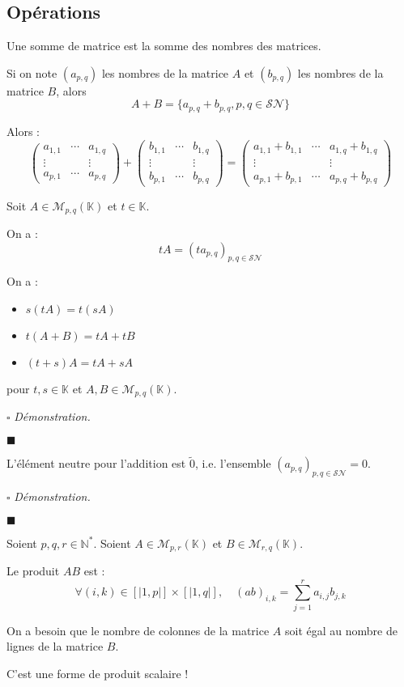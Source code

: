 \documentclass[a4paper, titlepage]{article}
\renewenvironment{proof}{$\square$ \footnotesize\textit{Démonstration.}}{\begin{flushright}$\blacksquare$\end{flushright}}
\begin{document}
	\subsection{Opérations}
	\begin{defn}
		Une somme de matrice est la somme  des nombres des matrices.

		Si on note $(a_{p,q})$ les nombres de la matrice $A$ et $(b_{p,q})$ les nombres de la matrice $B$, alors
		$$ A+B = \{a_{p,q}+b_{p,q},p,q\in\mathcal{SN}\} $$

		Alors :
		$$ \begin{pmatrix} a_{1,1} & \cdots & a_{1,q} \\ \vdots & & \vdots \\ a_{p,1} & \cdots & a_{p,q} \end{pmatrix} + \begin{pmatrix} b_{1,1} & \cdots & b_{1,q} \\ \vdots & & \vdots \\ b_{p,1} & \cdots & b_{p,q} \end{pmatrix} = \begin{pmatrix} a_{1,1} + b_{1,1} & \cdots & a_{1,q} + b_{1,q} \\ \vdots & & \vdots \\ a_{p,1} + b_{p,1} & \cdots & a_{p,q} + b_{p,q} \end{pmatrix} $$
	\end{defn}
	\begin{defn}
		Soit $A\in\mathcal{M}_{p,q}(\mathbb{K})$ et $t\in\mathbb{K}$.

		On a :
		$$ t A = (ta_{p,q})_{p,q\in\mathcal{SN}} $$
	\end{defn}
	\begin{props}
		On a :
		\begin{itemize}
			\item $s(tA) = t(sA)$
			\item $t(A+B) = tA+tB$
			\item $(t+s)A = tA+sA$
		\end{itemize}
		pour $t,s\in\mathbb{K}$ et $A,B\in\mathcal{M}_{p,q}(\mathbb{K})$.
	\end{props}
	\begin{proof}
		\AQT
	\end{proof}
	\begin{props}
		L'élément neutre pour l'addition est $\tilde 0$, i.e. l'ensemble $(a_{p,q})_{p,q\in\mathcal{SN}} = 0$.
	\end{props}
	\begin{proof}
		\AQT
	\end{proof}
	\begin{defn}
		Soient $p,q,r\in\mathbb{N}^*$. Soient $A\in\mathcal{M}_{p,r}(\mathbb{K})$ et $B\in\mathcal{M}_{r,q}(\mathbb{K})$.

		Le produit $AB$ est :
		$$ \forall (i,k)\in[|1,p|]\times[|1,q|],\quad (ab)_{i,k} = \sum_{j=1}^{r} a_{i,j}b_{j,k} $$
	\end{defn}
	\begin{warn}
		On a besoin que le nombre de colonnes de la matrice $A$ soit égal au nombre de lignes de la matrice $B$.
	\end{warn}
	C'est une forme de produit scalaire !
\end{document}
